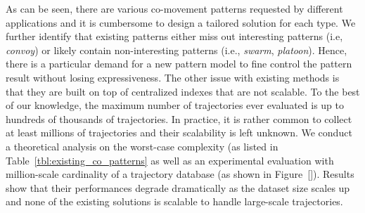 



As can be seen, there are various co-movement patterns requested by different applications and it is cumbersome to design a tailored solution for each type. 
We further identify that existing patterns either miss out interesting patterns (i.e, \emph{convoy}) 
or likely contain non-interesting patterns (i.e., \emph{swarm}, \emph{platoon}).
Hence, there is a particular demand for a new pattern model to fine control the pattern result without losing expressiveness. 
The other issue with existing methods is that they are built on top of centralized indexes that are not scalable. To the best of our knowledge, the maximum number of trajectories ever evaluated is up to hundreds of thousands of trajectories. In practice, it is rather common to collect at least millions of trajectories and their scalability is left unknown. We conduct a theoretical analysis on the worst-case complexity (as listed in Table~\ref{tbl:existing_co_patterns} as well as an experimental evaluation with million-scale cardinality of a trajectory database (as shown in Figure~\ref{}). Results show that their performances degrade dramatically as the dataset size scales up and none of the existing solutions is scalable to handle large-scale trajectories.

